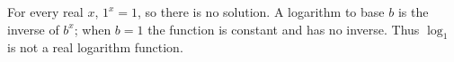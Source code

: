 For every real $x$, $1^x=\boxed1$, so there is no solution. A logarithm to base $b$ is the inverse of $b^x$; when $b=1$ the function is constant and has no inverse. Thus $\log_1$ is not a real logarithm function.
